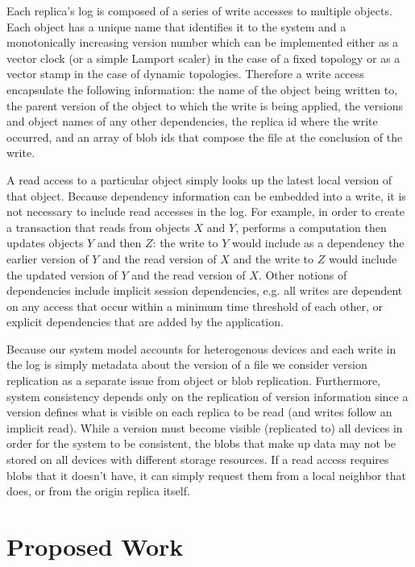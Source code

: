 \documentclass{article}
\begin{document}
Each replica's log is composed of a series of write accesses to multiple objects. Each object has a unique name that identifies it to the system and a monotonically increasing version number which can be implemented either as a vector clock \cite{parker_detection_1983} (or a simple Lamport scaler) in the case of a fixed topology or as a vector stamp \cite{almeida_version_2002} in the case of dynamic topologies. Therefore a write access encapsulate the following information: the name of the object being written to, the parent version of the object to which the write is being applied, the versions and object names of any other dependencies, the replica id where the write occurred, and an array of blob ids that compose the file at the conclusion of the write.

A read access to a particular object simply looks up the latest local version of that object. Because dependency information can be embedded into a write, it is not necessary to include read accesses in the log. For example, in order to create a transaction that reads from objects $X$ and $Y$, performs a computation then updates objects $Y$ and then $Z$: the write to $Y$ would include as a dependency the earlier version of $Y$ and the read version of $X$ and the write to $Z$ would include the updated version of $Y$ and the read version of $X$. Other notions of dependencies include implicit session dependencies, e.g. all writes are dependent on any access that occur within a minimum time threshold of each other, or explicit dependencies that are added by the application.

Because our system model accounts for heterogenous devices and each write in the log is simply metadata about the version of a file we consider version replication as a separate issue from object or blob replication. Furthermore, system consistency depends only on the replication of version information since a version defines what is visible on each replica to be read (and writes follow an implicit read). While a version must become visible (replicated to) all devices in order for the system to be consistent, the blobs that make up data may not be stored on all devices with different storage resources. If a read access requires blobs that it doesn't have, it can simply request them from a local neighbor that does, or from the origin replica itself.

\section{Proposed Work}
\end{document}
